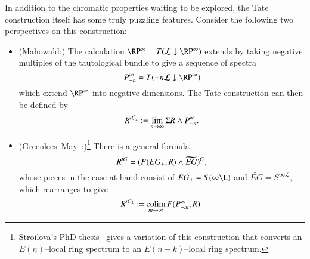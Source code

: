 In addition to the chromatic properties waiting to be explored, the Tate construction itself has some truly puzzling features.  Consider the following two perspectives on this construction:
\begin{itemize}
    \item (Mahowald:) The calculation $\RP^\infty = T(\mathcal L \downarrow \RP^\infty)$ extends by taking negative multiples of the tautological bundle to give a sequence of spectra \[P^\infty_{-n} = T(-n\mathcal L \downarrow \RP^\infty)\] which extend $\RP^\infty$ into negative dimensions.  The Tate construction can then be defined by \[R^{tC_2} := \lim_{n \to \infty} \Sigma R \wedge P^\infty_{-n}.\]
    \item (Greenlees--May~\cite{GreenleesMay}:)\footnote{Stroilova's PhD thesis~\cite{Stroilova} gives a variation of this construction that converts an $E(n)$--local ring spectrum to an $E(n-k)$--local ring spectrum.} There is a general formula \[R^{tG} = (F(EG_+, R) \wedge \widetilde{EG})^G,\] whose pieces in the case at hand consist of $EG_+ = S(\infty \L)$ and $\widetilde{EG} = S^{\infty \mathcal L}$, which rearranges to give \[R^{tC_2} := \operatorname*{colim}_{m \to \infty} F(P^\infty_{-m}, R).\]
\end{itemize}
